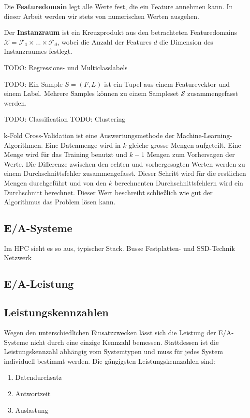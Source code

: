 Die \textbf{Featuredomain} legt alle Werte fest, die ein Feature annehmen kann. In dieser Arbeit werden wir stets von numerischen Werten ausgehen.

Der \textbf{Instanzraum} ist ein Kreuzprodukt aus den betrachteten Featuredomains $\mathscr{X} = \mathscr{F}_1 \times \dots \times \mathscr{F}_d$, wobei die Anzahl der Features $d$ die Dimension des Instanzraumes festlegt.

TODO: Regressions- und Multiclasslabels

TODO: Ein Sample $S = (F, L)$ ist ein Tupel aus einem Featurevektor und einem Label. Mehrere Samples können zu einem Sampleset $\mathcal{S}$ zusammengefasst werden.

TODO: Classification
TODO: Clustering

k-Fold Cross-Validation ist eine Auswertungsmethode der Machine-Learning-Algorithmen. Eine Datenmenge wird in $k$ gleiche grosse Mengen aufgeteilt. Eine Menge wird für das Training benutzt und $k-1$ Mengen zum Vorhersagen der Werte. Die Differenze zwischen den echten und vorhergesagten Werten werden zu einem Durchschnittsfehler zusammengefasst. Dieser Schritt wird für die restlichen Mengen durchgeführt und von den $k$ berechnenten Durchschnittsfehlern wird ein Durchschnitt berechnet. Dieser Wert beschreibt schließlich wie gut der Algorithmus das Problem lösen kann.

\subsection{E/A-Systeme}

Im HPC sieht es so aus, typischer Stack.
Busse
Festplatten- und SSD-Technik
Netzwerk


\subsection{E/A-Leistung}


\subsection{Leistungskennzahlen}
Wegen den unterschiedlichen Einsatzzwecken lässt sich die Leistung der E/A-Systeme nicht durch eine einzige Kennzahl bemessen. Stattdessen ist die Leistungskennzahl abhängig vom Systemtypen und muss für jedes System individuell bestimmt werden. Die gängigsten Leistungskennzahlen sind:
\begin{enumerate}
	\item Datendurchsatz
	\item Antwortzeit
	\item Auslastung
\end{enumerate}


